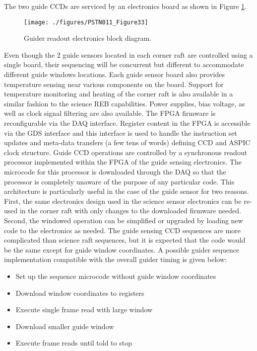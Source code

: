 The two guide CCDs are serviced by an electronics board as shown in Figure \ref{fig:Fig33}.

\begin{figure}[htbp]
\begin{center}
\texttt{[image: ./figures/PSTN011\_Figure33]}
\caption{Guider readout electronics block diagram.}
\label{fig:Fig33}
\end{center}
\end{figure}

Even though the 2 guide sensors located in each corner raft are controlled using a single board, their
sequencing will be concurrent but different to accommodate different guide windows locations. Each
guide sensor board also provides temperature sensing near various components on the board. Support
for temperature monitoring and heating of the corner raft is also available in a similar fashion to the
science REB capabilities. Power supplies, bias voltage, as well as clock signal filtering are also available.
The FPGA firmware is reconfigurable via the DAQ interface. Register content in the FPGA is accessible via
the GDS interface and this interface is used to handle the instruction set updates and meta-data
transfers (a few tens of words) defining CCD and ASPIC clock structure.
Guide CCD operations are controlled by a synchronous readout processor implemented within the FPGA
of the guide sensing electronics. The microcode for this processor is downloaded through the DAQ so
that the processor is completely unaware of the purpose of any particular code. This architecture is
particularly useful in the case of the guide sensor for two reasons. First, the same electronics design
used in the science sensor electronics can be re-used in the corner raft with only changes to the
downloaded firmware needed. Second, the windowed operation can be simplified or upgraded by
loading new code to the electronics as needed.
The guide sensing CCD sequences are more complicated than science raft sequences, but it is expected
that the code would be the same except for guide window coordinates. A possible guider sequence
implementation compatible with the overall guider timing is given below:

\begin{itemize}
\item{}Set up the sequence microcode without guide window coordinates
\item{} Download window coordinates to registers
\item{} Execute single frame read with large window
\item{} Download smaller guide window
\item{} Execute frame reads until told to stop
\end{itemize}

